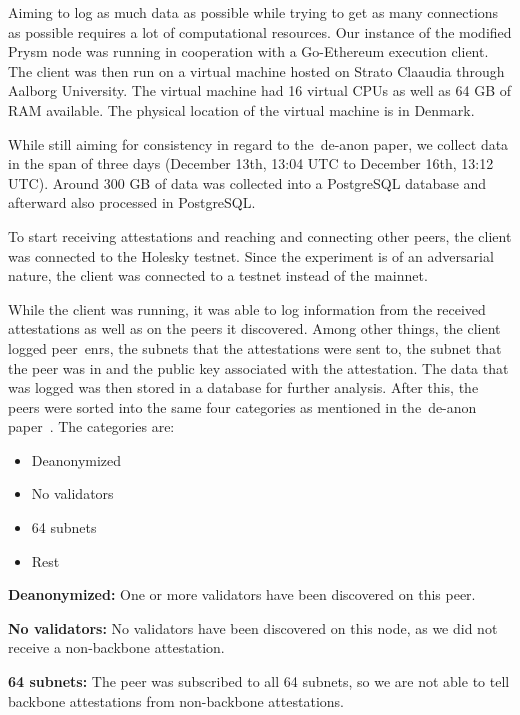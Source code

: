 Aiming to log as much data as possible while trying to get as many connections as possible requires a lot of computational resources.
Our instance of the modified Prysm node was running in cooperation with a Go-Ethereum execution client.
The client was then run on a virtual machine hosted on Strato Claaudia through Aalborg University.
The virtual machine had 16 virtual CPUs as well as 64 GB of RAM available.
The physical location of the virtual machine is in Denmark.

While still aiming for consistency in regard to the~\gls{de-anon paper}, we collect data in the span of three days (December 13th, 13:04 UTC to December 16th, 13:12 UTC).
Around 300 GB of data was collected into a PostgreSQL database and afterward also processed in PostgreSQL\@.


To start receiving attestations and reaching and connecting other peers,
the client was connected to the Holesky testnet.
Since the experiment is of an adversarial nature, the client was connected to a testnet instead of the mainnet.

While the client was running,
it was able to log information from the received attestations as well as on the peers it discovered.
Among other things, the client logged peer~\glspl{enr}, the subnets that the attestations were sent to,
the subnet that the peer was in and the public key associated with the attestation.
The data that was logged was then stored in a database for further analysis.
After this,
the peers were sorted into the same four categories
as mentioned in the~\gls{de-anon paper}~\cite{heimbach2024deanonymizingethereumvalidatorsp2p}.
The categories are:
\begin{itemize}
    \item Deanonymized
    \item No validators
    \item 64 subnets
    \item Rest
\end{itemize}

\textbf{Deanonymized:} One or more validators have been discovered on this peer.

\textbf{No validators:} No validators have been discovered on this node, as we did not receive a non-backbone attestation.

\textbf{64 subnets:} The peer was subscribed to all 64 subnets,
so we are not able to tell backbone attestations from non-backbone attestations.

